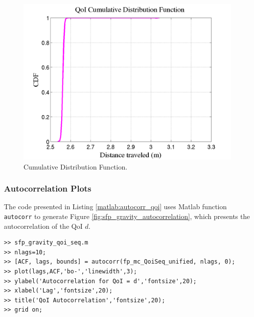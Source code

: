 \begin{figure}[htpb]
\centering 
\includegraphics[scale=0.40]{rawfigs/sfp_gravity_cdf.png}
\vspace*{-10pt}
\caption{Cumulative Distribution Function.}
\label{fig:sfp_gravity_cdf}
\end{figure}

\subsubsection{Autocorrelation Plots}

The code presented in Listing \ref{matlab:autocorr_qoi} uses Matlab function \verb+autocorr+ to generate Figure \ref{fig:sfp_gravity_autocorrelation},
which presents the autocorrelation of the QoI $d$.

\begin{lstlisting}[label=matlab:autocorr_qoi,caption={Matlab code for the QoI autocorrelation plot.}]
% inside Matlab
>> sfp_gravity_qoi_seq.m
>> nlags=10;
>> [ACF, lags, bounds] = autocorr(fp_mc_QoiSeq_unified, nlags, 0);
>> plot(lags,ACF,'bo-','linewidth',3);
>> ylabel('Autocorrelation for QoI = d','fontsize',20);
>> xlabel('Lag','fontsize',20);
>> title('QoI Autocorrelation','fontsize',20);
>> grid on;
\end{lstlisting}

